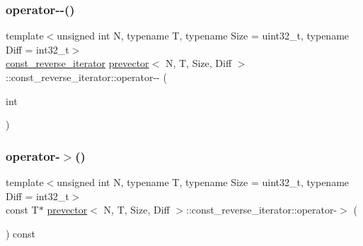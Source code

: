 \mbox{\label{classprevector_1_1const__reverse__iterator_a575758594e8e2f63d1fd6228192c054a}} 
\subsubsection{\texorpdfstring{operator-\/-\/()}{operator--()}\hspace{0.1cm}{\footnotesize\ttfamily [2/2]}}
{\footnotesize\ttfamily template$<$unsigned int N, typename T, typename Size = uint32\+\_\+t, typename Diff = int32\+\_\+t$>$ \\
\mbox{\hyperlink{classprevector_1_1const__reverse__iterator}{const\+\_\+reverse\+\_\+iterator}} \mbox{\hyperlink{classprevector}{prevector}}$<$ N, T, Size, Diff $>$\+::const\+\_\+reverse\+\_\+iterator\+::operator-\/-\/ (\begin{DoxyParamCaption}\item[{int}]{ }\end{DoxyParamCaption})\hspace{0.3cm}{\ttfamily [inline]}}

\mbox{\label{classprevector_1_1const__reverse__iterator_a3f9ff7d9e7dcb7cc11e1a7eb37f4e328}} 
\subsubsection{\texorpdfstring{operator-\/$>$()}{operator->()}}
{\footnotesize\ttfamily template$<$unsigned int N, typename T, typename Size = uint32\+\_\+t, typename Diff = int32\+\_\+t$>$ \\
const T$\ast$ \mbox{\hyperlink{classprevector}{prevector}}$<$ N, T, Size, Diff $>$\+::const\+\_\+reverse\+\_\+iterator\+::operator-\/$>$ (\begin{DoxyParamCaption}{ }\end{DoxyParamCaption}) const\hspace{0.3cm}{\ttfamily [inline]}}

